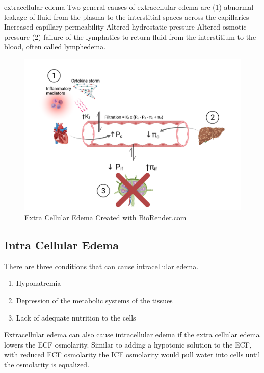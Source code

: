 extracellular edema
Two general causes of extracellular edema are
 (1) abnormal leakage of fluid from the plasma to the interstitial spaces across the capillaries
Increased capillary permeability
Altered hydrostatic pressure
Altered osmotic pressure
(2) failure of the lymphatics to return fluid from the interstitium to the blood, often called lymphedema.

\begin{figure}[!h]
    \centering
    \includegraphics[width=1\linewidth]{./figure/Extracellular_Edema.png}
    \caption{Extra Cellular Edema \footnotesize{Created with BioRender.com}}
    \label{fig:Extracellular_Edema}
\end{figure}

\subsection{Intra Cellular Edema}

There are three conditions that can cause intracellular edema.
\begin{enumerate}
    \item Hyponatremia
    \item Depression of the metabolic systems of the tissues
    \item Lack of adequate nutrition to the cells
\end{enumerate}

Extracellular edema can also cause intracellular edema if the extra cellular edema lowers the ECF osmolarity. Similar to adding a hypotonic solution to the ECF, with reduced ECF osmolarity the ICF osmolarity would pull water into cells until the osmolarity is equalized.

